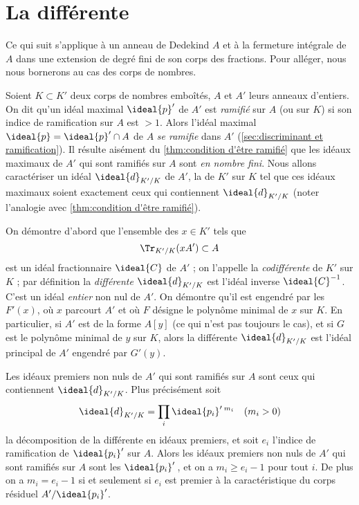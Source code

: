 \documentclass[11pt, useosf,
  title in boldface,
  theorem in new line,
  theorem numbering = section,
  number theorems separately,
]{simplivre}
\begin{document}
\section*{La différente}

    Ce qui suit s'applique à un anneau de Dedekind \( A \) et à la fermeture intégrale de \( A \) dans une extension de degré fini de son corps des fractions. Pour alléger, nous nous bornerons au cas des corps de nombres.

    Soient \( K \subset K' \) deux corps de nombres emboîtés, \( A \) et \( A' \) leurs anneaux d'entiers. On dit qu'un idéal maximal \( \ideal{p}' \) de \( A' \) est \emph{ramifié} sur \( A \) (ou sur \( K \)) si son indice de ramification sur \( A \) est \( > 1 \). Alors l'idéal maximal \( \ideal{p} = \ideal{p}' \cap A \) de \( A \) \emph{se ramifie} dans \( A' \) (\cref{sec:discriminant et ramification}). Il résulte aisément du \cref{thm:condition d'être ramifié} que les idéaux maximaux de \( A' \) qui sont ramifiés sur \( A \) sont \emph{en nombre fini}. Nous allons caractériser un idéal \( \ideal{d}_{K'/K} \) de \( A' \), la  de \( K' \) sur \( K \) tel que ces idéaux maximaux soient exactement ceux qui contiennent \( \ideal{d}_{K'/K} \) (noter l'analogie avec \cref{thm:condition d'être ramifié}).

    On démontre d'abord que l'ensemble des \( x \in K' \) tels que
    \begin{equation}
        \Tr_{K'/K}(xA') \subset A
    \end{equation}
    est un idéal fractionnaire \( \ideal{C} \) de \( A' \) ; on l'appelle la \emph{codifférente} de \( K' \) sur \( K \) ; par définition la \emph{différente} \( \ideal{d}_{K'/K} \) est l'idéal inverse \( \ideal{C}^{-1} \). C'est un idéal \emph{entier} non nul de \( A' \). On démontre qu'il est engendré par les \( F'(x) \), où \( x \) parcourt \( A' \) et où \( F \) désigne le polynôme minimal de \( x \) sur \( K \). En particulier, si \( A' \) est de la forme \( A[y] \) (ce qui n'est pas toujours le cas), et si \( G \) est le polynôme minimal de \( y \) sur \( K \), alors la différente \( \ideal{d}_{K'/K} \) est l'idéal principal de \( A' \) engendré par \( G'(y) \).

    Les idéaux premiers non nuls de \( A' \) qui sont ramifiés sur \( A \) sont ceux qui contiennent \( \ideal{d}_{K'/K} \). Plus précisément soit
    \begin{equation}
        \ideal{d}_{K'/K} = \prod_i \ideal{p_i}'\,{}^{m_i} \quad \text{(\( m_i > 0 \))}
    \end{equation}
    la décomposition de la différente en idéaux premiers, et soit \( e_i \) l'indice de ramification de \( \ideal{p_i}' \) sur \( A \). Alors les idéaux premiers non nuls de \( A' \) qui sont ramifiés sur \( A \) sont les \( \ideal{p_i}' \)\,, et on a \( m_i \geqslant e_i - 1 \) pour tout \( i \). De plus on a \( m_i = e_i - 1 \) si et seulement si \( e_i \) est premier à la caractéristique du corps résiduel \( A'/\ideal{p_i}' \).
\end{document}

